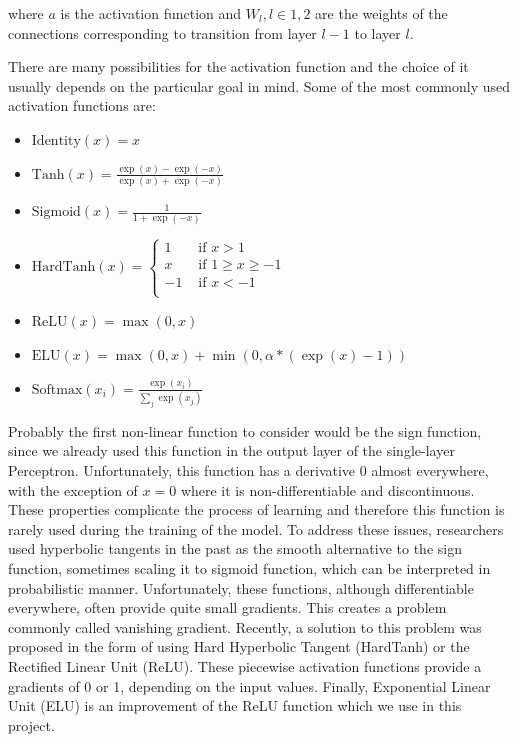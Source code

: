 where $a$ is the activation function and $W_l, l \in {1, 2}$ are the weights of the connections corresponding to transition from layer $l-1$ to layer $l$.

There are many possibilities for the activation function and the choice of it usually depends on the particular goal in mind.
Some of the most commonly used activation functions are:

\begin{itemize}
    \item $\text{Identity}(x) = x$
    \item $\text{Tanh}(x) = \frac{\exp(x) - \exp(-x)}{\exp(x) + \exp(-x)}$
    \item $\text{Sigmoid}(x) = \frac{1}{1 + \exp(-x)}$
    \item $\text{HardTanh}(x) = \begin{cases}
             1 & \text{ if } x > 1 \\
             x & \text{ if } 1 \geq x \geq -1 \\
            -1 & \text{ if } x < -1 \\
          \end{cases}$
    \item $\text{ReLU}(x) = \max(0, x)$
    \item $\text{ELU}(x) = \max(0,x) + \min(0, \alpha * (\exp(x) - 1))$
    \item $\text{Softmax}(x_{i}) = \frac{\exp(x_i)}{\sum_j \exp(x_j)}$
    \label{list:activations}
\end{itemize}


Probably the first non-linear function to consider would be the sign function, since we already used this function in the output layer of the single-layer Perceptron.
Unfortunately, this function has a derivative 0 almost everywhere, with the exception of $x=0$ where it is non-differentiable and discontinuous.
These properties complicate the process of learning and therefore this function is rarely used during the training of the model.
To address these issues, researchers used hyperbolic tangents in the past as the smooth alternative to the sign function, sometimes scaling it to sigmoid function, which can be interpreted in probabilistic manner.
Unfortunately, these functions, although differentiable everywhere, often provide quite small gradients.
This creates a problem commonly called vanishing gradient.
Recently, a solution to this problem was proposed in the form of using Hard Hyperbolic Tangent (HardTanh) or the Rectified Linear Unit (ReLU).
These piecewise activation functions provide a gradients of 0 or 1, depending on the input values.
Finally, Exponential Linear Unit (ELU) is an improvement of the ReLU function which we use in this project. 
